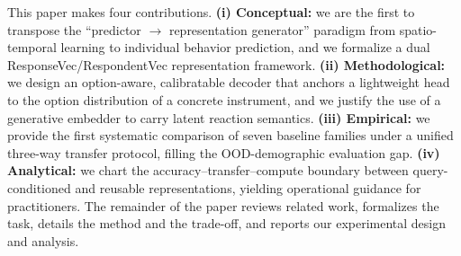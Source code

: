This paper makes four contributions. \textbf{(i) Conceptual:} we are the first to transpose the ``predictor $\rightarrow$ representation generator'' paradigm from spatio-temporal learning to individual behavior prediction, and we formalize a dual ResponseVec/RespondentVec representation framework. \textbf{(ii) Methodological:} we design an option-aware, calibratable decoder that anchors a lightweight head to the option distribution of a concrete instrument, and we justify the use of a generative embedder to carry latent reaction semantics. \textbf{(iii) Empirical:} we provide the first systematic comparison of seven baseline families under a unified three-way transfer protocol, filling the OOD-demographic evaluation gap. \textbf{(iv) Analytical:} we chart the accuracy--transfer--compute boundary between query-conditioned and reusable representations, yielding operational guidance for practitioners. The remainder of the paper reviews related work, formalizes the task, details the method and the trade-off, and reports our experimental design and analysis.
